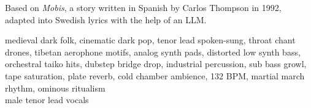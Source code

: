 

\begin{notes}
Based on \emph{Mobis}, a story written in Spanish by Carlos Thompson in 1992, adapted into Swedish lyrics with the help of an LLM.
\end{notes}

\begin{style}
medieval dark folk, cinematic dark pop, tenor lead spoken-sung, throat chant drones, tibetan aerophone motifs, analog synth pads, distorted low synth bass, orchestral taiko hits, dubstep bridge drop, industrial percussion, sub bass growl, tape saturation, plate reverb, cold chamber ambience, 132 BPM, martial march rhythm, ominous ritualism\\
male tenor lead vocals
\end{style}

